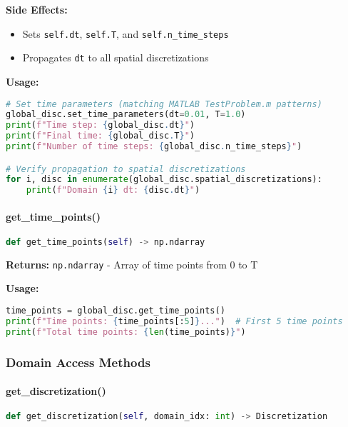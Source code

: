 \textbf{Side Effects:} 
\begin{itemize}
    \item Sets \texttt{self.dt}, \texttt{self.T}, and \texttt{self.n\_time\_steps}
    \item Propagates \texttt{dt} to all spatial discretizations
\end{itemize}

\textbf{Usage:}
\begin{lstlisting}[language=Python, caption=Time Parameters Usage]
# Set time parameters (matching MATLAB TestProblem.m patterns)
global_disc.set_time_parameters(dt=0.01, T=1.0)
print(f"Time step: {global_disc.dt}")
print(f"Final time: {global_disc.T}")
print(f"Number of time steps: {global_disc.n_time_steps}")

# Verify propagation to spatial discretizations
for i, disc in enumerate(global_disc.spatial_discretizations):
    print(f"Domain {i} dt: {disc.dt}")
\end{lstlisting}

\paragraph{get\_time\_points()}
\begin{lstlisting}[language=Python, caption=Get Time Points Method]
def get_time_points(self) -> np.ndarray
\end{lstlisting}

\textbf{Returns:} \texttt{np.ndarray} - Array of time points from 0 to T

\textbf{Usage:}
\begin{lstlisting}[language=Python, caption=Time Points Usage]
time_points = global_disc.get_time_points()
print(f"Time points: {time_points[:5]}...")  # First 5 time points
print(f"Total time points: {len(time_points)}")
\end{lstlisting}

\subsubsection{Domain Access Methods}

\paragraph{get\_discretization()}
\begin{lstlisting}[language=Python, caption=Get Discretization Method]
def get_discretization(self, domain_idx: int) -> Discretization
\end{lstlisting}

